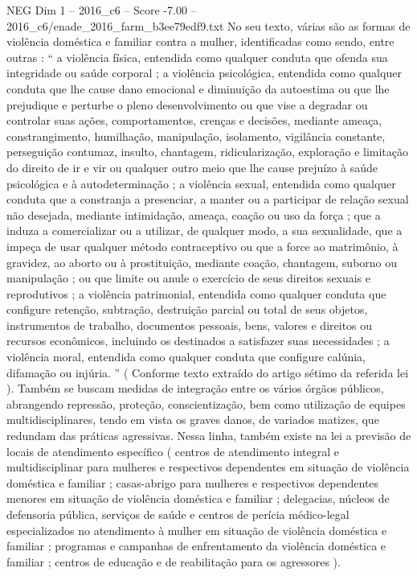 \begin{textsample}{NEG Dim 1 – 2016\_c6 – Score -7.00 – 2016\_c6/enade\_2016\_farm\_b3ee79edf9.txt}
No seu texto, várias são as formas de violência doméstica e familiar contra a mulher, identificadas como sendo, entre outras : “ a violência física, entendida como qualquer conduta que ofenda sua integridade ou saúde corporal ; a violência psicológica, entendida como qualquer conduta que lhe cause dano emocional e diminuição da autoestima ou que lhe prejudique e perturbe o pleno desenvolvimento ou que vise a degradar ou controlar suas ações, comportamentos, crenças e decisões, mediante ameaça, constrangimento, humilhação, manipulação, isolamento, vigilância constante, perseguição contumaz, insulto, chantagem, ridicularização, exploração e limitação do direito de ir e vir ou qualquer outro meio que lhe cause prejuízo à saúde psicológica e à autodeterminação ; a violência sexual, entendida como qualquer conduta que a constranja a presenciar, a manter ou a participar de relação sexual não desejada, mediante intimidação, ameaça, coação ou uso da força ; que a induza a comercializar ou a utilizar, de qualquer modo, a sua sexualidade, que a impeça de usar qualquer método contraceptivo ou que a force ao matrimônio, à gravidez, ao aborto ou à prostituição, mediante coação, chantagem, suborno ou manipulação ; ou que limite ou anule o exercício de seus direitos sexuais e reprodutivos ; a violência patrimonial, entendida como qualquer conduta que configure retenção, subtração, destruição parcial ou total de seus objetos, instrumentos de trabalho, documentos pessoais, bens, valores e direitos ou recursos econômicos, incluindo os destinados a satisfazer suas necessidades ; a violência moral, entendida como qualquer conduta que configure calúnia, difamação ou injúria. ” ( Conforme texto extraído do artigo sétimo da referida lei ).
Também se buscam medidas de integração entre os vários órgãos públicos, abrangendo repressão, proteção, conscientização, bem como utilização de equipes multidisciplinares, tendo em vista os graves danos, de variados matizes, que redundam das práticas agressivas.
Nessa linha, também existe na lei a previsão de locais de atendimento específico ( centros de atendimento integral e multidisciplinar para mulheres e respectivos dependentes em situação de violência doméstica e familiar ; casas-abrigo para mulheres e respectivos dependentes menores em situação de violência doméstica e familiar ; delegacias, núcleos de defensoria pública, serviços de saúde e centros de perícia médico-legal especializados no atendimento à mulher em situação de violência doméstica e familiar ; programas e campanhas de enfrentamento da violência doméstica e familiar ; centros de educação e de reabilitação para os agressores ).

\end{textsample}
